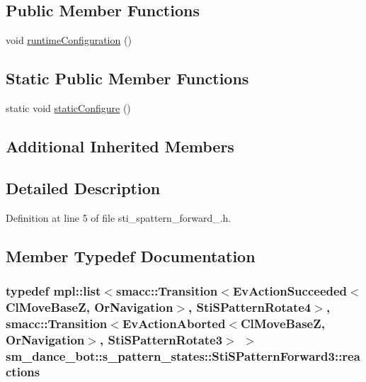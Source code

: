 \subsection*{Public Member Functions}
\begin{DoxyCompactItemize}
\item 
void \hyperlink{structsm__dance__bot_1_1s__pattern__states_1_1StiSPatternForward3_ab249799ab476f00517b8e831af0409d7}{runtime\+Configuration} ()
\end{DoxyCompactItemize}
\subsection*{Static Public Member Functions}
\begin{DoxyCompactItemize}
\item 
static void \hyperlink{structsm__dance__bot_1_1s__pattern__states_1_1StiSPatternForward3_a95b52e8147aa4169010fa9bc00ea63e0}{static\+Configure} ()
\end{DoxyCompactItemize}
\subsection*{Additional Inherited Members}


\subsection{Detailed Description}


Definition at line 5 of file sti\+\_\+spattern\+\_\+forward\+\_.\+h.



\subsection{Member Typedef Documentation}
\subsubsection[{\texorpdfstring{reactions}{reactions}}]{\setlength{\rightskip}{0pt plus 5cm}typedef mpl\+::list$<${\bf smacc\+::\+Transition}$<$Ev\+Action\+Succeeded$<${\bf Cl\+Move\+BaseZ}, {\bf Or\+Navigation}$>$, {\bf Sti\+S\+Pattern\+Rotate4}$>$, {\bf smacc\+::\+Transition}$<$Ev\+Action\+Aborted$<${\bf Cl\+Move\+BaseZ}, {\bf Or\+Navigation}$>$, {\bf Sti\+S\+Pattern\+Rotate3}$>$ $>$ {\bf sm\+\_\+dance\+\_\+bot\+::s\+\_\+pattern\+\_\+states\+::\+Sti\+S\+Pattern\+Forward3\+::reactions}}\hypertarget{structsm__dance__bot_1_1s__pattern__states_1_1StiSPatternForward3_ad0d5134c584a97e028442758b0ce3283}{}\label{structsm__dance__bot_1_1s__pattern__states_1_1StiSPatternForward3_ad0d5134c584a97e028442758b0ce3283}


